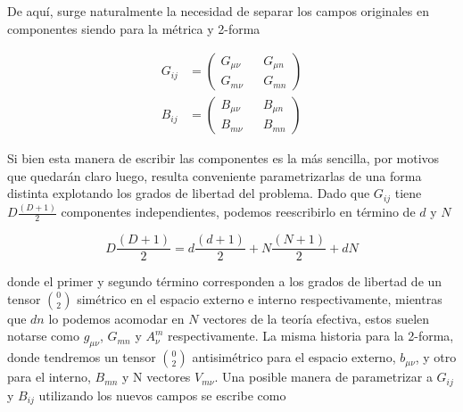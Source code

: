 \documentclass{article}
\numberwithin{equation}{section}
\begin{document}
De aquí, surge naturalmente la necesidad de separar los campos originales en componentes siendo para la métrica y 2-forma

\begin{equation}
\begin{aligned}
G_{i j} &= 
\begin{pmatrix}
G_{\mu \nu} && G_{\mu n}\\
G_{m \nu} && G_{m n}
\end{pmatrix}\\
B_{i j} &= 
\begin{pmatrix}
B_{\mu \nu} && B_{\mu n}\\
B_{m \nu} && B_{m n}
\end{pmatrix}
\end{aligned}
\end{equation}

Si bien esta manera de escribir las componentes es la más sencilla, por motivos que quedarán claro luego, resulta conveniente parametrizarlas de una forma distinta explotando los grados de libertad del problema. Dado que $ G_{i j} $ tiene $ D\frac{\left(D+1\right)}{2} $ componentes independientes, podemos reescribirlo en término de $ d $ y $ N $

\begin{equation}
D\frac{\left(D+1\right)}{2} = d\frac{\left(d+1\right)}{2} + N\frac{\left(N+1\right)}{2} +d N
\end{equation}

donde el primer y segundo término corresponden a los grados de libertad de un tensor $ \binom{0}{2} $ simétrico en el espacio externo e interno respectivamente, mientras que $ d n $ lo podemos acomodar en $ N $ vectores de la teoría efectiva, estos suelen notarse como $ g_{\mu \nu} $, $ G_{m n} $ y $ A^m_{\nu} $ respectivamente. La misma historia para la 2-forma, donde tendremos un tensor $ \binom{0}{2} $ antisimétrico para el espacio externo, $ b_{\mu \nu} $, y otro para el interno, $ B_{m n} $ y N vectores $ V_{m \nu} $. Una posible manera de parametrizar a $ G_{i j} $ y $ B_{i j} $ utilizando los nuevos campos se escribe como
\end{document}

